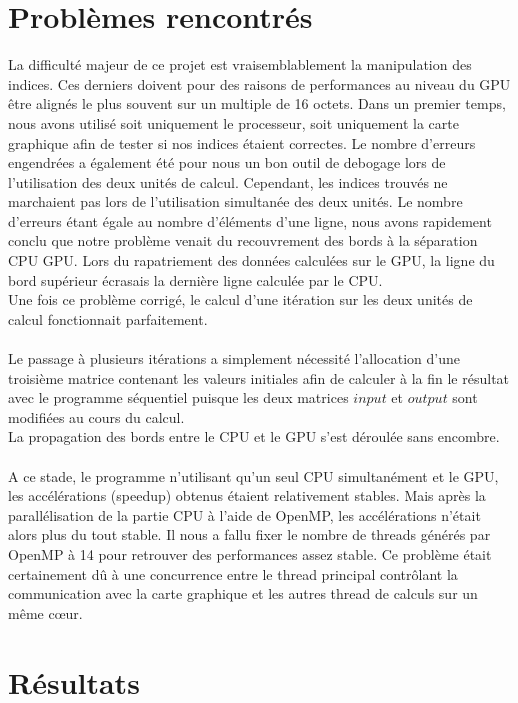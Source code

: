 \documentclass[a4paper,oneside,12pt]{article}
\begin{document}
\section*{Problèmes rencontrés}

La difficulté majeur de ce projet est vraisemblablement la manipulation des indices.
Ces derniers doivent pour des raisons de performances au niveau du GPU être alignés le plus souvent sur
un multiple de 16 octets.
Dans un premier temps, nous avons utilisé soit uniquement le processeur, 
soit uniquement la carte graphique afin de tester si nos indices étaient correctes. Le nombre d'erreurs
engendrées a également été pour nous un bon outil de debogage lors de l'utilisation des deux unités de calcul.
Cependant, les indices trouvés ne marchaient pas lors de l'utilisation simultanée des deux unités.
Le nombre d'erreurs étant égale au nombre d'éléments d'une ligne, nous avons rapidement conclu
que notre problème venait du recouvrement des bords à la séparation CPU GPU. Lors du rapatriement des données
calculées sur le GPU, la ligne du bord supérieur écrasais la dernière ligne calculée par le CPU.\\
Une fois ce problème corrigé, le calcul d'une itération sur les deux unités de calcul fonctionnait parfaitement.\\\\

Le passage à plusieurs itérations a simplement nécessité l'allocation d'une troisième matrice contenant les valeurs initiales
afin de calculer à la fin le résultat avec le programme séquentiel puisque les deux matrices $input$ et $output$ 
sont modifiées au cours du calcul.\\
La propagation des bords entre le CPU et le GPU s'est déroulée sans encombre.\\\\

A ce stade, le programme n'utilisant qu'un seul CPU simultanément et le GPU, les accélérations (speedup) obtenus étaient
relativement stables. Mais après la parallélisation de la partie CPU à l'aide de OpenMP, 
les accélérations n'était alors plus du tout stable. Il nous a fallu fixer le nombre de threads générés 
par OpenMP à 14 pour retrouver des performances assez stable. Ce problème était certainement dû à 
une concurrence entre le thread principal contrôlant la communication avec la carte graphique et les 
autres thread de calculs sur un même cœur.

\section*{Résultats}
\end{document}
